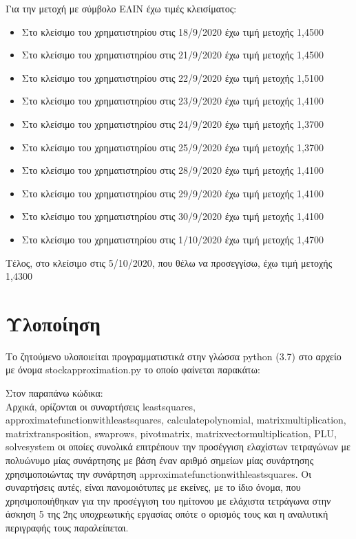 \documentclass[a4paper,11pt]{article}
\newcommand{\lt}{\latintext}
\newcommand{\gt}{\greektext}
\begin{document}
\par
Για την μετοχή με σύμβολο ΕΛΙΝ έχω τιμές κλεισίματος:
\begin{itemize}
    \item Στο κλείσιμο του χρηματιστηρίου στις 18/9/2020 έχω τιμή μετοχής 1,4500
    \item Στο κλείσιμο του χρηματιστηρίου στις 21/9/2020 έχω τιμή μετοχής 1,4500
    \item Στο κλείσιμο του χρηματιστηρίου στις 22/9/2020 έχω τιμή μετοχής 1,5100
    \item Στο κλείσιμο του χρηματιστηρίου στις 23/9/2020 έχω τιμή μετοχής 1,4100
    \item Στο κλείσιμο του χρηματιστηρίου στις 24/9/2020 έχω τιμή μετοχής 1,3700
    \item Στο κλείσιμο του χρηματιστηρίου στις 25/9/2020 έχω τιμή μετοχής 1,3700
    \item Στο κλείσιμο του χρηματιστηρίου στις 28/9/2020 έχω τιμή μετοχής 1,4100
    \item Στο κλείσιμο του χρηματιστηρίου στις 29/9/2020 έχω τιμή μετοχής 1,4100
    \item Στο κλείσιμο του χρηματιστηρίου στις 30/9/2020 έχω τιμή μετοχής 1,4100
    \item Στο κλείσιμο του χρηματιστηρίου στις 1/10/2020 έχω τιμή μετοχής 1,4700
\end{itemize}
Τέλος, στο κλείσιμο στις 5/10/2020, που θέλω να προσεγγίσω, έχω τιμή μετοχής  1,4300

\section{Υλοποίηση}
Το ζητούμενο υλοποιείται προγραμματιστικά στην γλώσσα {\lt python} (3.7) στο αρχείο με όνομα {\lt stock\textunderscore approximation.py} το οποίο φαίνεται παρακάτω:
\lt

\gt

\par
Στον παραπάνω κώδικα:\\
Αρχικά, ορίζονται οι συναρτήσεις {\lt least\textunderscore squares}, {\lt approximate\textunderscore function\textunderscore with\textunderscore least\textunderscore squares}, {\lt calculate\textunderscore polynomial}, {\lt matrix\textunderscore multiplication}, {\lt matrix\textunderscore transposition}, {\lt swap\textunderscore rows, pivot\textunderscore matrix, matrix\textunderscore vector\textunderscore multiplication, PLU, solve\textunderscore system} οι οποίες συνολικά επιτρέπουν την προσέγγιση ελαχίστων τετραγώνων με πολυώνυμο μίας συνάρτησης  με βάση έναν αριθμό σημείων μίας συνάρτησης χρησιμοποιώντας την συνάρτηση  {\lt approximate\textunderscore function\textunderscore with\textunderscore least\textunderscore squares}. Οι συναρτήσεις αυτές, είναι πανομοιότυπες με εκείνες, με το ίδιο όνομα, που χρησιμοποιήθηκαν για την προσέγγιση του ημίτονου με ελάχιστα τετράγωνα στην άσκηση 5 της 2ης υποχρεωτικής εργασίας οπότε ο ορισμός τους και η αναλυτική περιγραφής τους παραλείπεται. 
\end{document}
